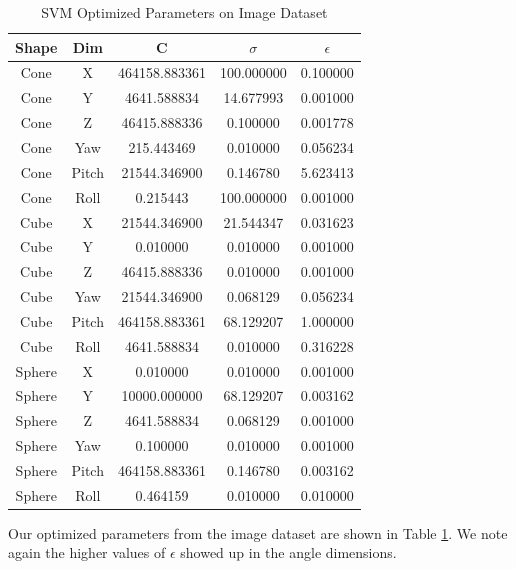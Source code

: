 \documentclass[journal]{IEEEtran}
\begin{document}
\begin{table}[h]
\caption{SVM Optimized Parameters on Image Dataset}
\label{SVM_Image_Parms}
\centering

\begin{tabular}{|c|c|c|c|c|}
\hline
Shape & Dim & C & $\sigma$ & $\epsilon$\\
\hline
Cone & X & 464158.883361 & 100.000000 & 0.100000\\
Cone & Y & 4641.588834 & 14.677993 & 0.001000\\
Cone & Z & 46415.888336 & 0.100000 & 0.001778\\
Cone & Yaw & 215.443469 & 0.010000 & 0.056234\\
Cone & Pitch & 21544.346900 & 0.146780 & 5.623413\\
Cone & Roll & 0.215443 & 100.000000 & 0.001000\\
\hline
Cube & X & 21544.346900 & 21.544347 & 0.031623\\
Cube & Y & 0.010000 & 0.010000 & 0.001000\\
Cube & Z & 46415.888336 & 0.010000 & 0.001000\\
Cube & Yaw & 21544.346900 & 0.068129 & 0.056234\\
Cube & Pitch & 464158.883361 & 68.129207 & 1.000000\\
Cube & Roll & 4641.588834 & 0.010000 & 0.316228\\
\hline
Sphere & X & 0.010000 & 0.010000 & 0.001000\\
Sphere & Y & 10000.000000 & 68.129207 & 0.003162\\
Sphere & Z & 4641.588834 & 0.068129 & 0.001000\\
Sphere & Yaw & 0.100000 & 0.010000 & 0.001000\\
Sphere & Pitch & 464158.883361 & 0.146780 & 0.003162\\
Sphere & Roll & 0.464159 & 0.010000 & 0.010000\\
\hline

\end{tabular}

\end{table}

Our optimized parameters from the image dataset are shown in Table \ref{SVM_Image_Parms}.  We note again the higher values of $\epsilon$ showed up in the angle dimensions.
\end{document}
